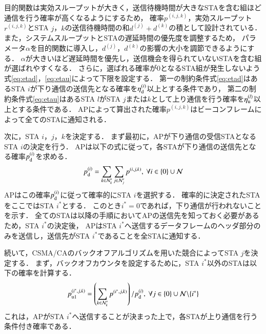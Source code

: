 \documentclass[master]{kuisthesis}		%
\newcommand{\pijk}{p^{(i,j,k)}}
\newcommand{\rijk}{r^{(i,j,k)}}
\newcommand{\mthnj}{{\mathcal N}'_j}
\newcommand{\mthnk}{{\mathcal N}'_k}
\begin{document}
			\par
			目的関数は実効スループットが大きく，送信待機時間が大きなSTAを含む組ほど通信を行う確率が高くなるようにするため，
			確率$\pijk$，実効スループット$\rijk$とSTA $j$，$k$の送信待機時間の和$d^{(j)}+d^{(k)}$の積として設計されている．
			また，システムスループットとSTAの遅延時間の優先度を調整するため，
			パラメータ$\alpha$を目的関数に導入し，$d^{(j)}$，$d^{(k)}$の影響の大小を調節できるようにする．
			$\alpha$が大きいほど遅延時間を優先し，送信機会を得られていないSTAを含む組が選ばれやすくなる．
			さらに，選ばれる確率が0となるSTA組が発生しないよう式\eqref{eq:etad}，\eqref{eq:etau}によって下限を設定する．
			第一の制約条件式\eqref{eq:etad}はあるSTA $i$が下り通信の送信先となる確率を$\eta_{\rm d}^{(i)}$以上とする条件であり，
			第二の制約条件式\eqref{eq:etau}はあるSTA $l$がSTA $j$または$k$として上り通信を行う確率を$\eta_{\rm u}^{(l)}$以上とする条件である．
			APによって算出された確率$\pijk$はビーコンフレームによって全てのSTAに通知される．
			\par
			次に，STA $i$，$j$，$k$を決定する．
			まず最初に，APが下り通信の受信STAとなるSTA $i$の決定を行う．
			APは以下の式に従って，各STAが下り通信の送信先となる確率$p_{\rm d}^{(i)}$を求める．
			\begin{equation}
				p_{\rm d}^{(i)}= \sum_{k\in\mthnk}\sum_{j\in\mthnj}p^{(i,j,k)}, \ \forall i \in \{0\}\cup{\mathcal N}
			\end{equation}
			APはこの確率$p_{\rm d}^{(i)}$に従って確率的にSTA $i$を選択する．
			確率的に決定されたSTAをここではSTA $i^*$とする．
			このとき$i^*=0$であれば，下り通信が行われないことを示す．
			全てのSTAは以降の手順においてAPの送信先を知っておく必要があるため，STA $i^*$の決定後，
			APはSTA $i^*$へ送信するデータフレームのヘッダ部分のみを送信し，送信先がSTA $i^*$であることを全STAに通知する．
			\par
			続いて，CSMA/CAのバックオフアルゴリズムを用いた競合によってSTA $j$を決定する．
			まず，バックオフカウンタを設定するために，STA $i^*$以外のSTAは以下の確率を計算する．
			\begin{align}
				p_{\rm u1}^{(i^*,j,k)}=\left(\sum_{k\in\mthnk} p^{(i^*,j,k)}\right) / p_{\rm d}^{(i)},\ \forall j \in \{0\}\cup{\mathcal N}\backslash \{i^*\}
			\end{align}
			これは，APがSTA $i^*$へ送信することが決まった上で，各STAが上り通信を行う条件付き確率である．
\end{document}
